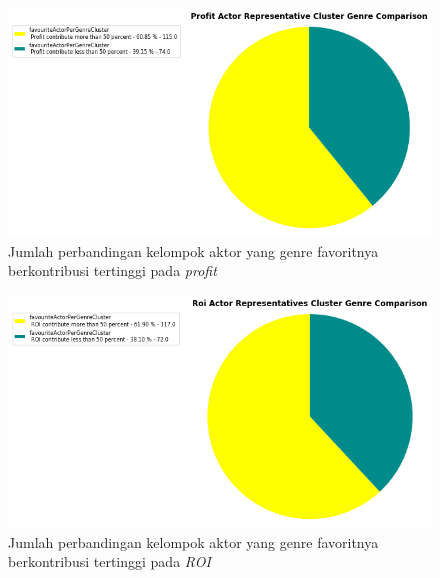 \begin{figure}[H]
	\centering  
	\includegraphics[scale=0.6]{./Lampiran/gambar/pieChartClusterGenre_FavActor_ProfitContributionComparison}   
	\caption{Jumlah perbandingan kelompok aktor yang genre favoritnya berkontribusi tertinggi pada \textit{profit} }
	\label{fig:pieChartClusterGenre_FavActor_ProfitContributionComparison} 
\end{figure} 


\begin{figure}[H]
	\centering  
	\includegraphics[scale=0.6]{./Lampiran/gambar/pieChartClusterGenre_FavActor_ROIContributionComparison}   
	\caption{Jumlah perbandingan kelompok aktor yang genre favoritnya berkontribusi tertinggi pada \textit{ROI} }
	\label{fig:pieChartClusterGenre_FavActor_ROIContributionComparison} 
\end{figure} 



